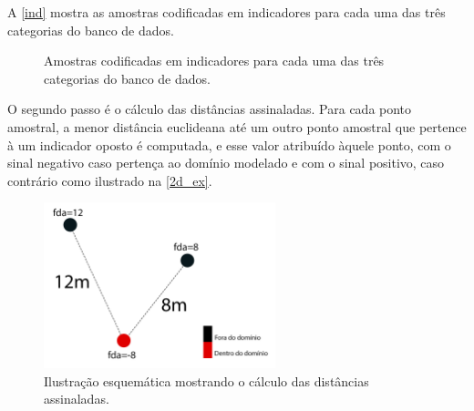 A \autoref{ind} mostra as amostras codificadas em indicadores para cada uma das três categorias do banco de dados.

\begin{figure}[H]
    \caption{Amostras codificadas em indicadores para cada uma das três categorias do banco de dados.} \label{ind}
     \centering
\end{figure}

O segundo passo é o cálculo das distâncias assinaladas. Para cada ponto amostral, a menor distância euclideana até um outro ponto amostral que pertence à um indicador oposto é computada, e esse valor atribuído àquele ponto, com o sinal negativo caso pertença ao domínio modelado e com o sinal positivo, caso contrário como ilustrado na \autoref{2d_ex}. 

\begin{figure}[H]
	\caption{\label{2d_ex}Ilustração esquemática mostrando o cálculo das distâncias assinaladas.}
	\begin{center}
		\includegraphics[width=0.6\textwidth]{capitulo_2/2d_ex.jpg}
	\end{center}
\end{figure}

